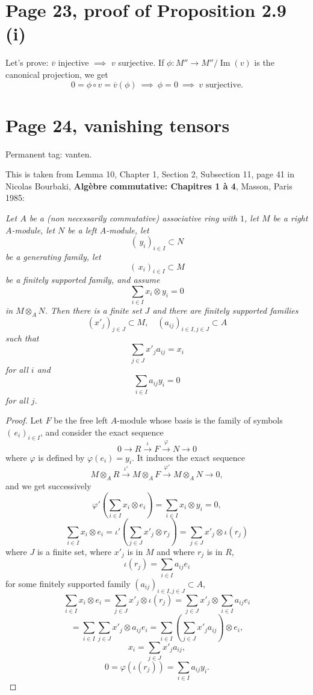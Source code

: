 \documentclass[parskip=half]{scrartcl}%
\newcommand{\oo}{\operatorname}
\begin{document}
\section{Page 23, proof of Proposition 2.9 (i)}%

Let's prove: $\overline v$ injective $\implies$ $v$ surjective. If $\phi:M''\to M''/\oo{Im}(v)$ is the canonical projection, we get 
$$
0=\phi\circ v=\overline v(\phi)\ \implies\ \phi=0\ \implies\ v\text{ surjective.}
$$

\section{Page 24, vanishing tensors}\label{vt}%

Permanent tag: vanten.

This is taken from Lemma 10, Chapter 1, Section 2, Subsection 11, page 41 in Nicolas Bourbaki, \textbf{Algèbre commutative: Chapitres 1 à 4}, Masson, Paris 1985:

\emph{Let $A$ be a (non necessarily commutative) associative ring with $1$, let $M$ be a right $A$-module, let $N$ be a left $A$-module, let 
$$
(\,y_i)_{i\in I}\subset N
$$ 
be a generating family, let 
$$
(\,x_i)_{i\in I}\subset M
$$ 
be a finitely supported family, and assume 
$$
\sum_{i\in I}x_i\otimes y_i=0
$$ 
in $M\otimes_AN$. Then there is a finite set $J$ and there are finitely supported families 
$$
(x'_j)_{j\in J}\subset M,\quad(a_{ij})_{i\in I,j\in J}\subset A
$$ 
such that 
$$
\sum_{j\in J} x'_ja_{ij}=x_i
$$ 
for all $i$ and 
$$
\sum_{i\in I}a_{ij}y_i=0
$$ 
for all $j$.}

\begin{proof} 
Let $F$ be the free left $A$-module whose basis is the family of symbols $(\,e_i)_{i\in I}$, and consider the exact sequence 
$$
0\to R\xrightarrow\iota F\xrightarrow\varphi N\to 0
$$ 
where $\varphi$ is defined by $\varphi(e_i)=y_i$. It induces the exact sequence 
$$
M\otimes_AR\xrightarrow{\iota'}M\otimes_AF\xrightarrow{\varphi'}M\otimes_AN\to 0,
$$ 
and we get successively
$$
\varphi'\left(\sum_{i\in I}x_i\otimes e_i\right)=\sum_{i\in I}x_i\otimes y_i=0,
$$ 
$$
\sum_{i\in I}x_i\otimes e_i=\iota'\left(\sum_{j\in J}x'_j\otimes r_j\right)=\sum_{j\in J}x'_j\otimes\iota(r_j)
$$ 
where $J$ is a finite set, where $x'_j$ is in $M$ and where $r_j$ is in $R$, 
$$
\iota(r_j)=\sum_{i\in I}a_{ij}e_i
$$ 
for some finitely supported family $(a_{ij})_{i\in I,j\in J}\subset A$, 
$$
\sum_{i\in I}x_i\otimes e_i=\sum_{j\in J}x'_j\otimes\iota(r_j)=\sum_{j\in J} x'_j\otimes\sum_{i\in I}a_{ij}e_i
$$
$$
=\sum_{i\in I}\sum_{j\in J} x'_j\otimes a_{ij}e_i=\sum_{i\in I}\left(\sum_{j\in J}x'_ja_{ij}\right)\otimes e_i,
$$ 
$$
x_i=\sum_{j\in J}x'_ja_{ij},
$$ 
$$
0=\varphi(\iota(r_j))=\sum_{i\in I}a_{ij}y_i.
$$ 
\end{proof}
\end{document}
